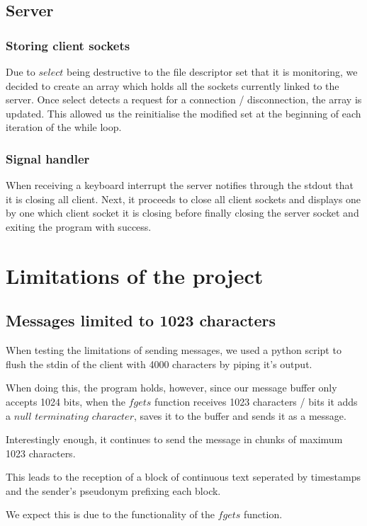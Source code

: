 \documentclass[utf8]{article}
\begin{document}
\subsection{Server}

\subsubsection{Storing client sockets}
Due to $select$ being destructive to the file descriptor set that it is monitoring, we decided to create an array which holds all the sockets currently linked to the server. Once select detects a request for a connection / disconnection, the array is updated. This allowed us the reinitialise the modified set at the beginning of each iteration of the while loop.

\subsubsection{Signal handler}
When receiving a keyboard interrupt the server notifies through the stdout that it is closing all client. Next, it proceeds to close all client sockets and displays one by one which client socket it is closing before finally closing the server socket and exiting the program with success.

\section{Limitations of the project}

\subsection{Messages limited to 1023 characters}
When testing the limitations of sending messages, we used a python script to flush the stdin of the client with 4000 characters by piping it's output. \par 
When doing this, the program holds, however, since our message buffer only accepts 1024 bits, when the $fgets$ function receives 1023 characters / bits it adds a $null$ $terminating$ $character$, saves it to the buffer and sends it as a message. \par
Interestingly enough, it continues to send the message in chunks of maximum 1023 characters. \par
This leads to the reception of a block of continuous text seperated by timestamps and the sender's pseudonym prefixing each block. \par
We expect this is due to the functionality of the $fgets$ function.
\end{document}
